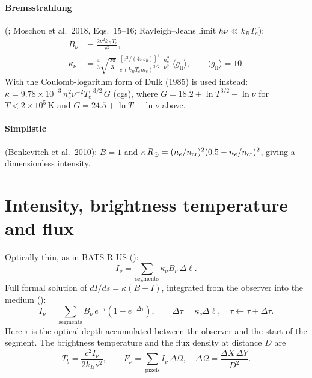 \paragraph{Bremsstrahlung} (; Moschou et al.\ 2018, Eqs.~15--16;
Rayleigh--Jeans limit $h\nu\ll k_BT_e$):
\begin{align}
  B_\nu &= \frac{2\nu^2k_BT_e}{c^2}, \\
  \kappa_\nu &= \frac43\sqrt{\frac{2\pi}{3}}\;
     \frac{\left[e^2/(4\pi\varepsilon_0)\right]^3}{c\,(k_BT_e m_e)^{3/2}}\;
     \frac{n_e^2}{\nu^2}\;\langle g_\text{ff}\rangle ,\qquad \langle g_\text{ff}\rangle=10 .
\end{align}
With  the Coulomb-logarithm form of Dulk (1985) is used instead:
$\kappa=9.78\times10^{-3}\,n_e^2\nu^{-2}T_e^{-3/2}\,G$ (cgs), where
$G=18.2+\ln T^{3/2}-\ln\nu$ for $T<2\times10^5$\,K and $G=24.5+\ln T-\ln\nu$ above.

\paragraph{Simplistic} (Benkevitch et al.\ 2010): $B=1$ and
$\kappa\,R_\odot=(n_e/n_\text{cr})^2(0.5-n_e/n_\text{cr})^2$, giving a dimensionless
intensity.

\section{Intensity, brightness temperature and flux}
Optically thin, as in BATS-R-US ():
\begin{equation}
  I_\nu=\sum_\text{segments}\kappa_\nu B_\nu\,\Delta\ell .
\end{equation}
Full formal solution of $dI/ds=\kappa(B-I)$, integrated from the observer into the
medium ():
\begin{equation}
  I_\nu=\sum_\text{segments}B_\nu\,e^{-\tau}\left(1-e^{-\Delta\tau}\right),\qquad
  \Delta\tau=\kappa_\nu\Delta\ell,\quad \tau\leftarrow\tau+\Delta\tau .
\end{equation}
Here $\tau$ is the optical depth accumulated between the observer and the start of the
segment. The brightness temperature and the flux density at distance $D$ are
\begin{equation}
  T_b=\frac{c^2 I_\nu}{2k_B\nu^2},\qquad
  F_\nu=\sum_\text{pixels}I_\nu\,\Delta\Omega,\quad \Delta\Omega=\frac{\Delta X\,\Delta Y}{D^2}.
\end{equation}

